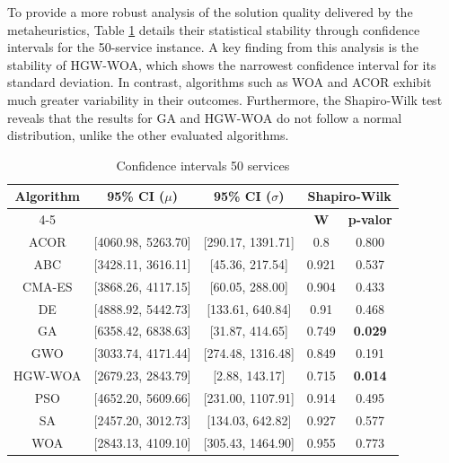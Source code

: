 \documentclass[Afour,sagev,times]{sagej}
\begin{document}
To provide a more robust analysis of the solution quality delivered by the metaheuristics, Table \ref{tab:confidence_intervals_50} details their statistical stability through confidence intervals for the 50-service instance. A key finding from this analysis is the stability of HGW-WOA, which shows the narrowest confidence interval for its standard deviation. In contrast, algorithms such as WOA and ACOR exhibit much greater variability in their outcomes. Furthermore, the Shapiro-Wilk test reveals that the results for GA and HGW-WOA do not follow a normal distribution, unlike the other evaluated algorithms.

\begin{table}[htbp]
\centering
\caption{Confidence intervals 50 services}
\label{tab:confidence_intervals_50}
\begin{tabular}{|c|c|c|c|c|}
\hline
\multirow{2}{*}{\textbf{Algorithm}} & \multirow{2}{*}{\textbf{95\% CI ($\mu$)}} & \multirow{2}{*}{\textbf{95\% CI ($\sigma$)}} & \multicolumn{2}{c|}{\textbf{Shapiro-Wilk}} \\
\cline{4-5} 
& & & \textbf{W} & \textbf{p-valor} \\ \hline \hline
ACOR & [4060.98, 5263.70] & [290.17, 1391.71] & 0.8 & 0.800 \\
ABC & [3428.11, 3616.11] & [45.36, 217.54] & 0.921 & 0.537 \\
CMA-ES & [3868.26, 4117.15] & [60.05, 288.00] & 0.904 & 0.433 \\
DE & [4888.92, 5442.73] & [133.61, 640.84] & 0.91 & 0.468 \\
GA & [6358.42, 6838.63] & [31.87, 414.65] & 0.749 &\textbf{0.029} \\
GWO & [3033.74, 4171.44] & [274.48, 1316.48] & 0.849 & 0.191 \\
HGW-WOA & [2679.23, 2843.79] & [2.88, 143.17] & 0.715 &\textbf{0.014} \\
PSO & [4652.20, 5609.66] & [231.00, 1107.91] & 0.914 & 0.495 \\
SA & [2457.20, 3012.73] & [134.03, 642.82] & 0.927 & 0.577 \\
WOA & [2843.13, 4109.10] & [305.43, 1464.90] & 0.955 & 0.773 \\ \hline
\end{tabular}
\end{table}
\end{document}
